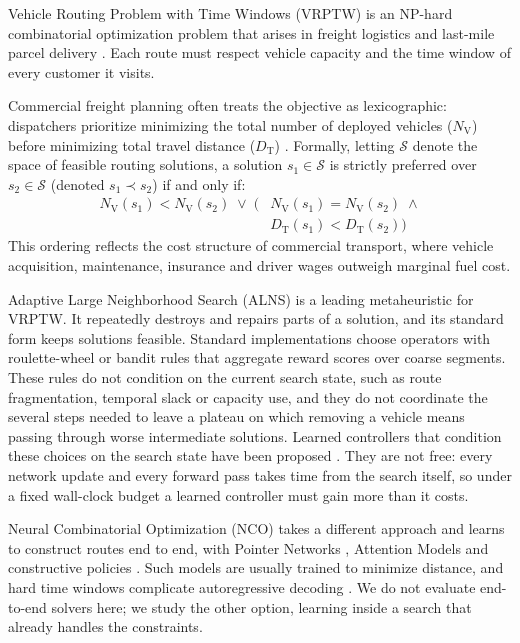 \documentclass{ieeeaccess}
\newcommand{\NV}{{N_\mathrm{V}}}
\newcommand{\TD}{{D_\mathrm{T}}}
\begin{document}
 Vehicle Routing Problem with Time Windows (VRPTW) is an NP-hard combinatorial optimization problem that arises in freight logistics and last-mile parcel delivery \cite{Dantzig1959, Solomon1987}. Each route must respect vehicle capacity and the time window of every customer it visits.

Commercial freight planning often treats the objective as lexicographic: dispatchers prioritize minimizing the total number of deployed vehicles ($\NV$) before minimizing total travel distance ($\TD$) \cite{Toth2014, braysy2005vehicle}. Formally, letting $\mathcal{S}$ denote the space of feasible routing solutions, a solution $s_1 \in \mathcal{S}$ is strictly preferred over $s_2 \in \mathcal{S}$ (denoted $s_1 \prec s_2$) if and only if:
\begin{equation}
  \begin{aligned}
    \NV(s_1) < \NV(s_2) \;\lor\; \big(&\NV(s_1) = \NV(s_2) \;\land \\
    &\TD(s_1) < \TD(s_2)\big)
  \end{aligned}
  \label{eq:lexicographic_intro}
\end{equation}
This ordering reflects the cost structure of commercial transport, where vehicle acquisition, maintenance, insurance and driver wages outweigh marginal fuel cost.

Adaptive Large Neighborhood Search (ALNS) \cite{pisinger2007general, Ropke2006} is a leading metaheuristic for VRPTW. It repeatedly destroys and repairs parts of a solution, and its standard form keeps solutions feasible. Standard implementations choose operators with roulette-wheel or bandit rules that aggregate reward scores over coarse segments. These rules do not condition on the current search state, such as route fragmentation, temporal slack or capacity use, and they do not coordinate the several steps needed to leave a plateau on which removing a vehicle means passing through worse intermediate solutions. Learned controllers that condition these choices on the search state have been proposed \cite{kallestad2023general, johnn2023graph, reijnen2024online}. They are not free: every network update and every forward pass takes time from the search itself, so under a fixed wall-clock budget a learned controller must gain more than it costs.

Neural Combinatorial Optimization (NCO) takes a different approach and learns to construct routes end to end, with Pointer Networks \cite{vinyals2015pointer}, Attention Models \cite{kool2019attention} and constructive policies \cite{nazari2018reinforcement}. Such models are usually trained to minimize distance, and hard time windows complicate autoregressive decoding \cite{falkner2020learning, lin2021deep}. We do not evaluate end-to-end solvers here; we study the other option, learning inside a search that already handles the constraints.
\end{document}
